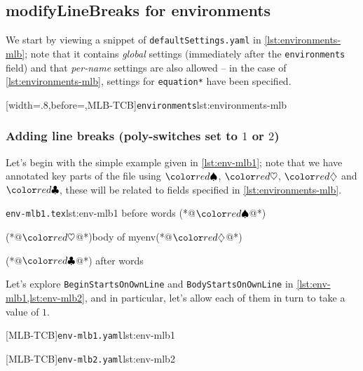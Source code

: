 \subsection{modifyLineBreaks for environments}
We start by viewing a snippet of \texttt{defaultSettings.yaml} in \cref{lst:environments-mlb}; note that it contains \emph{global} settings (immediately
after the \texttt{environments} field) and that \emph{per-name} settings are also allowed -- in the case of \cref{lst:environments-mlb}, settings 
for \texttt{equation*} have been specified. 

[width=.8\linewidth,before=\centering,MLB-TCB]{\texttt{environments}}{lst:environments-mlb}

\subsubsection{Adding line breaks (poly-switches set to $1$ or $2$)}
Let's begin with the simple example given in \cref{lst:env-mlb1}; note that we have annotated key parts of the file using $\BeginStartsOnOwnLine$, 
$\BodyStartsOnOwnLine$, $\EndStartsOnOwnLine$ and $\EndFinishesWithLineBreak$, these will be related to fields specified in \cref{lst:environments-mlb}.

\begin{cmhlistings}[escapeinside={(*@}{@*)}]{\texttt{env-mlb1.tex}}{lst:env-mlb1}
before words (*@$\BeginStartsOnOwnLine$@*)\begin{myenv}(*@$\BodyStartsOnOwnLine$@*)body of myenv(*@$\EndStartsOnOwnLine$@*)\end{myenv}(*@$\EndFinishesWithLineBreak$@*) after words
\end{cmhlistings}

Let's explore \texttt{BeginStartsOnOwnLine} and \texttt{BodyStartsOnOwnLine} in \cref{lst:env-mlb1,lst:env-mlb2}, and in particular, 
let's allow each of them in turn to take a value of $1$.

\begin{minipage}{.45\textwidth}
[MLB-TCB]{\texttt{env-mlb1.yaml}}{lst:env-mlb1}
\end{minipage}
\hfill
\begin{minipage}{.45\textwidth}
[MLB-TCB]{\texttt{env-mlb2.yaml}}{lst:env-mlb2}
\end{minipage}

